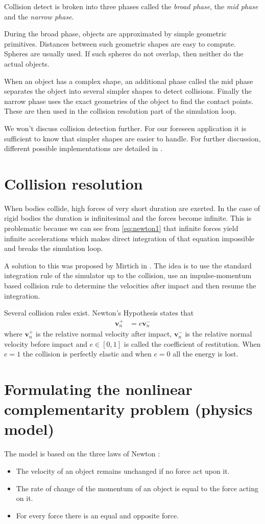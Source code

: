 Collision detect is broken into three phases called the \emph{broad phase}, the \emph{mid phase} and the \emph{narrow phase}. 

During the broad phase, objects are approximated by simple geometric primitives. Distances between such geometric shapes are easy to compute. Spheres are usually used. If such spheres do not overlap, then neither do the actual objects.

When an object has a complex shape, an additional phase called the mid phase separates the object into several simpler shapes to detect collisions. Finally the narrow phase uses the exact geometries of the object to find the contact points. These are then used in the collision resolution part of the simulation loop.

We won't discuss collision detection further. For our foreseen application it is sufficient to know that simpler shapes are easier to handle. For further discussion, different possible implementations are detailed in \cite{jimenez20013d}.

\section{Collision resolution}
When bodies collide, high forces of very short duration are exerted. In the case of rigid bodies the duration is infinitesimal and the forces become infinite. This is problematic because we can see from \cref{eq:newton1} that infinite forces yield infinite accelerations which makes direct integration of that equation impossible and breaks the simulation loop.

A solution to this was proposed by Mirtich in \cite{mirtich1996impulse}. The idea is to use the standard integration rule of the simulator up to the collision, use an impulse-momentum based collision rule to determine the velocities after impact and then resume the integration.

Several collision rules exist. Newton's Hypothesis states that 
\begin{align*}
\mathbf{v}_n^+ &= e\mathbf{v}_n^-
\end{align*}
where $\mathbf{v}_n^+$ is the relative normal velocity after impact, $\mathbf{v}_n^-$ is the relative normal velocity before impact and $e \in [0, 1]$ is called the coefficient of restitution. When $e=1$ the collision is perfectly elastic and when $e=0$ all the energy is lost.

\section{Formulating the nonlinear complementarity problem (physics model)}
The model is based on the three laws of Newton :\begin{itemize}
\item The velocity of an object remains unchanged if no force act upon it.
\item The rate of change of the momentum of an object is equal to the force acting on it.
\item For every force there is an equal and opposite force.
\end{itemize}

